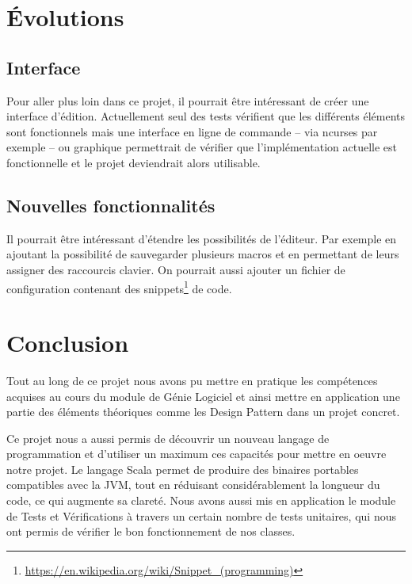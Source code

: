 \documentclass[french]{article}
\begin{document}
\section{Évolutions}

\subsection{Interface}

Pour aller plus loin dans ce projet, il pourrait être intéressant de créer une interface d'édition. Actuellement seul des tests vérifient que les différents éléments sont fonctionnels mais une interface en ligne de commande -- via ncurses par exemple -- ou graphique permettrait de vérifier que l'implémentation actuelle est fonctionnelle et le projet deviendrait alors utilisable.

\subsection{Nouvelles fonctionnalités}

Il pourrait être intéressant d'étendre les possibilités de l'éditeur. Par exemple en ajoutant la possibilité de sauvegarder plusieurs macros et en permettant de leurs assigner des raccourcis clavier. On pourrait aussi ajouter un fichier de configuration contenant des snippets\footnote{\url{https://en.wikipedia.org/wiki/Snippet_(programming)}} de code. 

\section{Conclusion}
Tout au long de ce projet nous avons pu mettre en pratique les compétences acquises au cours du module de Génie Logiciel et ainsi mettre en application une partie des éléments théoriques comme les Design Pattern dans un projet concret. 

Ce projet nous a aussi permis de découvrir un nouveau langage de programmation et d'utiliser un maximum ces capacités pour mettre en oeuvre notre projet. Le langage Scala permet de produire des binaires portables compatibles avec la JVM, tout en réduisant considérablement la longueur du code, ce qui augmente sa clareté. Nous avons aussi mis en application le module de Tests et Vérifications à travers un certain nombre de tests unitaires, qui nous ont permis de vérifier le bon fonctionnement de nos classes.


\end{document}

